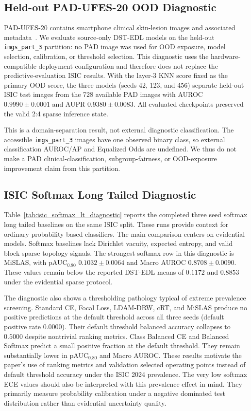 \documentclass[letterpaper]{article}
\begin{document}
\subsection{Held-out PAD-UFES-20 OOD Diagnostic}
PAD-UFES-20 contains smartphone clinical skin-lesion images and associated
metadata~\cite{pacheco2020padufes}. We evaluate source-only DST-EDL models on
the held-out \texttt{imgs\_part\_3} partition: no PAD image was used for OOD
exposure, model selection, calibration, or threshold selection. This diagnostic
uses the hardware-compatible deployment configuration and therefore does not
replace the predictive-evaluation ISIC results. With the layer-3 KNN score fixed as the
primary OOD score, the three models (seeds 42, 123, and 456) separate held-out
ISIC test images from the 728 available PAD images with AUROC
$0.9990\pm0.0001$ and AUPR $0.9380\pm0.0083$. All evaluated checkpoints
preserved the valid 2:4 sparse inference state.

This is a domain-separation result, not external diagnostic classification.
The accessible \texttt{imgs\_part\_3} images have one observed binary class,
so external classification AUROC/AP and Equalized Odds are undefined. We thus
do not make a PAD clinical-classification, subgroup-fairness, or OOD-exposure
improvement claim from this partition.

\subsection{ISIC Softmax Long Tailed Diagnostic}
Table~\ref{tab:isic_softmax_lt_diagnostic} reports the completed three seed
softmax long tailed baselines on the same ISIC split. These runs provide
context for ordinary probability based classifiers. The main comparison
centers on evidential models. Softmax baselines lack Dirichlet vacuity, expected
entropy, and valid block sparse topology signals. The strongest softmax row in
this diagnostic is MiSLAS, with pAUC$_{0.80}$ $0.1032\pm0.0064$ and
Macro AUROC $0.8708\pm0.0090$. These values remain below the reported DST-EDL means of
$0.1172$ and $0.8853$ under the evidential sparse protocol.

The diagnostic also shows a thresholding pathology typical of extreme prevalence
screening. Standard CE, Focal Loss, LDAM-DRW, cRT, and MiSLAS produce no
positive predictions at the default threshold across all three seeds
(default positive rate $0.0000$). Their default threshold balanced accuracy
collapses to $0.5000$ despite nontrivial ranking metrics. Class Balanced CE and
Balanced Softmax predict a small positive fraction at the default threshold.
They remain substantially lower in pAUC$_{0.80}$ and Macro AUROC. These results
motivate the paper's use of ranking metrics and validation selected operating
points instead of default threshold accuracy under the ISIC 2024 prevalence. The
very low softmax ECE values should also be interpreted with this prevalence
effect in mind. They primarily measure probability calibration under a negative
dominated test distribution rather than evidential uncertainty quality.
\end{document}
